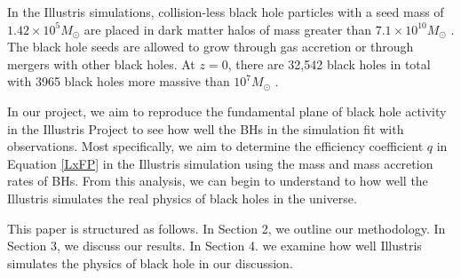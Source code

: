 \documentclass[12pt]{article}
\begin{document}
In the Illustris simulations, collision-less black hole particles with a seed mass of $1.42 \times 10^5 M_\odot$ are placed in dark matter halos of mass greater than $7.1 \times 10^10 M_\odot$ \cite{Sijacki2014}.  The black hole seeds are allowed to grow through gas accretion or through mergers with other black holes.  At $z=0$, there are 32,542 black holes in total with 3965 black holes more massive than $10^7 M_\odot$ \cite{Sijacki2014}. 

In our project, we aim to reproduce the fundamental plane of black hole activity in the Illustris Project to see how well the BHs in the simulation fit with observations. Most specifically, we aim to determine the efficiency coefficient $q$ in Equation \ref{LxFP} in the Illustris simulation using the mass and mass accretion rates of BHs. From this analysis, we can begin to understand to how well the Illustris simulates the real physics of black holes in the universe.

This paper is structured as follows. In Section 2, we outline our methodology. In Section 3, we discuss our results. In Section 4. we examine how well Illustris simulates the physics of black hole in our discussion. 


\printbibliography
\end{document}

